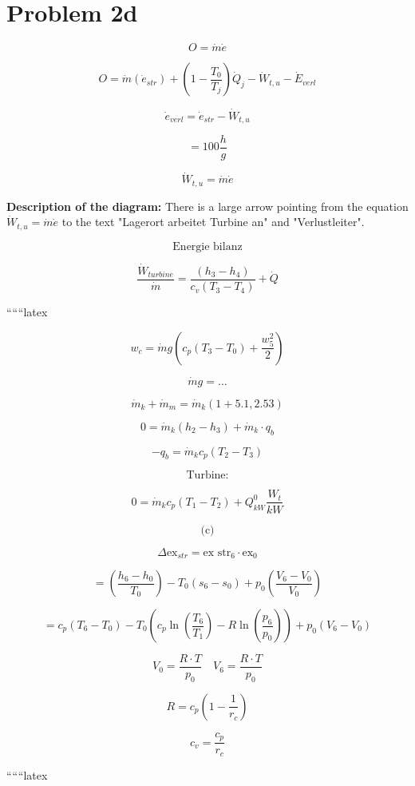 \section*{Problem 2d}

\begin{equation*}
O = \dot{m} \dot{e}
\end{equation*}

\begin{equation*}
O = \dot{m} (\dot{e}_{str}) + (1 - \frac{T_0}{T_j}) \dot{Q}_j - \dot{W}_{t,u} - \dot{E}_{verl}
\end{equation*}

\begin{equation*}
\dot{e}_{verl} = \dot{e}_{str} - \dot{W}_{t,u}
\end{equation*}

\begin{equation*}
= 100 \frac{h}{g}
\end{equation*}

\begin{equation*}
\dot{W}_{t,u} = \dot{m} \dot{e}
\end{equation*}

\textbf{Description of the diagram:} There is a large arrow pointing from the equation $\dot{W}_{t,u} = \dot{m} \dot{e}$ to the text "Lagerort arbeitet Turbine an" and "Verlustleiter".

\begin{equation*}
\text{Energie bilanz}
\end{equation*}

\begin{equation*}
\frac{\dot{W}_{turbine}}{\dot{m}} = \frac{(h_3 - h_4)}{c_v (T_3 - T_4)} + \dot{Q}
\end{equation*}

``````latex


\[
w_c = \dot{m}g \left( c_p (T_3 - T_0) + \frac{w_5^2}{2} \right)
\]

\[
\dot{m}g = \dots
\]

\[
\dot{m}_k + \dot{m}_m = \dot{m}_k (1 + 5.1, 2.53)
\]

\[
0 = \dot{m}_k (h_2 - h_3) + \dot{m}_k \cdot q_b
\]

\[
-q_b = \dot{m}_k c_p (T_2 - T_3)
\]

\[
\text{Turbine:}
\]

\[
0 = \dot{m}_k c_p (T_1 - T_2) + Q_{kW}^0 \frac{W_t}{kW}
\]

\[
\text{(c)}
\]

\[
\Delta \text{ex}_{str} = \text{ex str}_6 \cdot \text{ex}_0
\]

\[
= \left( \frac{h_6 - h_0}{T_0} \right) - T_0 (s_6 - s_0) + p_0 \left( \frac{V_6 - V_0}{V_0} \right)
\]

\[
= c_p (T_6 - T_0) - T_0 \left( c_p \ln \left( \frac{T_6}{T_1} \right) - R \ln \left( \frac{p_6}{p_0} \right) \right) + p_0 (V_6 - V_0)
\]

\[
V_0 = \frac{R \cdot T}{p_0} \quad V_6 = \frac{R \cdot T}{p_0}
\]

\[
R = c_p \left( 1 - \frac{1}{r_c} \right)
\]

\[
c_v = \frac{c_p}{r_c}
\]

``````latex